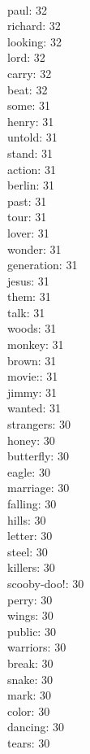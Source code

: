 \begin{multicols}{6}
  \\ paul: 32
  \\ richard: 32
  \\ looking: 32
  \\ lord: 32
  \\ carry: 32
  \\ beat: 32
  \\ some: 31
  \\ henry: 31
  \\ untold: 31
  \\ stand: 31
  \\ action: 31
  \\ berlin: 31
  \\ past: 31
  \\ tour: 31
  \\ lover: 31
  \\ wonder: 31
  \\ generation: 31
  \\ jesus: 31
  \\ them: 31
  \\ talk: 31
  \\ woods: 31
  \\ monkey: 31
  \\ brown: 31
  \\ movie:: 31
  \\ jimmy: 31
  \\ wanted: 31
  \\ strangers: 30
  \\ honey: 30
  \\ butterfly: 30
  \\ eagle: 30
  \\ marriage: 30
  \\ falling: 30
  \\ hills: 30
  \\ letter: 30
  \\ steel: 30
  \\ killers: 30
  \\ scooby-doo!: 30
  \\ perry: 30
  \\ wings: 30
  \\ public: 30
  \\ warriors: 30
  \\ break: 30
  \\ snake: 30
  \\ mark: 30
  \\ color: 30
  \\ dancing: 30
  \\ tears: 30

\end{multicols}
